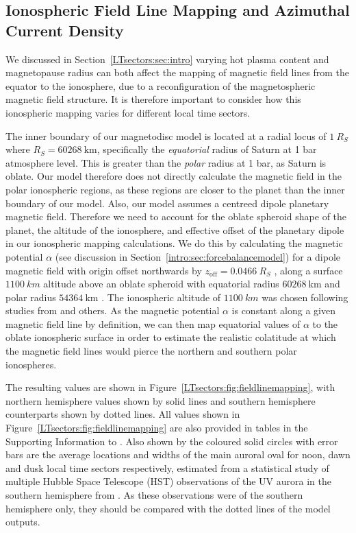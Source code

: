 \subsection{Ionospheric Field Line Mapping and Azimuthal Current Density} 
We discussed in Section~\ref{LTsectors:sec:intro} varying hot plasma content and magnetopause radius can both affect the mapping of magnetic field lines from the equator to the ionosphere, due to a reconfiguration of the magnetospheric magnetic field structure. It is therefore important to consider how this ionospheric mapping varies for different local time sectors.

The inner boundary of our magnetodisc model is located at a radial locus of $\SI{1}{R_S}$ where $\si{R_S}=\SI{60268}{\km}$, specifically the \textit{equatorial} radius of Saturn at 1 bar atmosphere level. This is greater than the \textit{polar} radius at 1 bar, as Saturn is oblate. Our model therefore does not directly calculate the magnetic field in the polar ionospheric regions, as these regions are closer to the planet than the inner boundary of our model. Also, our model assumes a centreed dipole planetary magnetic field. Therefore we need to account for the oblate spheroid shape of the planet, the altitude of the ionosphere, and effective offset of the planetary dipole in our ionospheric mapping calculations. We do this by calculating the magnetic potential $\alpha$ (see discussion in Section~\ref{intro:sec:forcebalancemodel}) for a dipole magnetic field with origin offset northwards by $z_\mathrm{off}=\SI{0.0466}{R_S}$ \citep{dougherty2018}, along a surface $\SI{1100}{km}$ altitude above an oblate spheroid with equatorial radius $\SI{60268}{\km}$ and polar radius $\SI{54364}{\km}$ \citep{seidelmann2007}. The ionospheric altitude of $\SI{1100}{km}$ was chosen following studies from \citet{gerard2009,stallard2012} and others. As the magnetic potential $\alpha$ is constant along a given magnetic field line by definition, we can then map equatorial values of $\alpha$ to the oblate ionospheric surface in order to estimate the realistic colatitude at which the magnetic field lines would pierce the northern and southern polar ionospheres.

The resulting values are shown in Figure~\ref{LTsectors:fig:fieldlinemapping}, with northern hemisphere values shown by solid lines and southern hemisphere counterparts shown by dotted lines. All values shown in Figure~\ref{LTsectors:fig:fieldlinemapping} are also provided in tables in the Supporting Information to \citet{sorba2019}. Also shown by the coloured solid circles with error bars are the average locations and widths of the main auroral oval for noon, dawn and dusk local time sectors respectively, estimated from a statistical study of multiple Hubble Space Telescope (HST) observations of the UV aurora in the southern hemisphere from \citet{badman2006}. As these observations were of the southern hemisphere only, they should be compared with the dotted lines of the model outputs.

